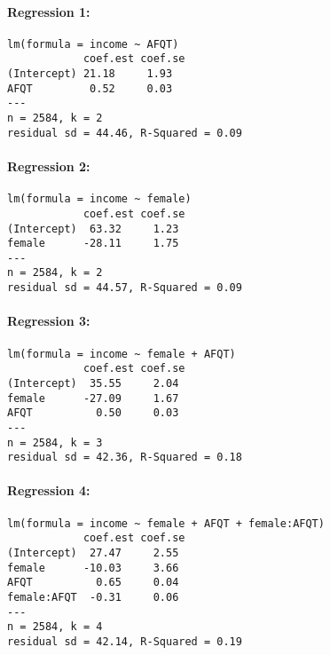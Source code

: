 \documentclass[addpoints,12pt]{exam}
\begin{document}
\begin{table}
\footnotesize
\caption{Regression Results}
\paragraph{Regression 1:}
\begin{verbatim}
lm(formula = income ~ AFQT)
            coef.est coef.se
(Intercept) 21.18     1.93  
AFQT         0.52     0.03  
---
n = 2584, k = 2
residual sd = 44.46, R-Squared = 0.09
	\end{verbatim}
	\paragraph{Regression 2:}
	\begin{verbatim}
lm(formula = income ~ female)
            coef.est coef.se
(Intercept)  63.32     1.23 
female      -28.11     1.75 
---
n = 2584, k = 2
residual sd = 44.57, R-Squared = 0.09
	\end{verbatim}
	\paragraph{Regression 3:}
	\begin{verbatim}
lm(formula = income ~ female + AFQT)
            coef.est coef.se
(Intercept)  35.55     2.04 
female      -27.09     1.67 
AFQT          0.50     0.03 
---
n = 2584, k = 3
residual sd = 42.36, R-Squared = 0.18
	\end{verbatim}
	\paragraph{Regression 4:}
	\begin{verbatim}
lm(formula = income ~ female + AFQT + female:AFQT)
            coef.est coef.se
(Intercept)  27.47     2.55 
female      -10.03     3.66 
AFQT          0.65     0.04 
female:AFQT  -0.31     0.06 
---
n = 2584, k = 4
residual sd = 42.14, R-Squared = 0.19
	\end{verbatim}
	\label{tab:reg}
\end{table}
\end{document}

